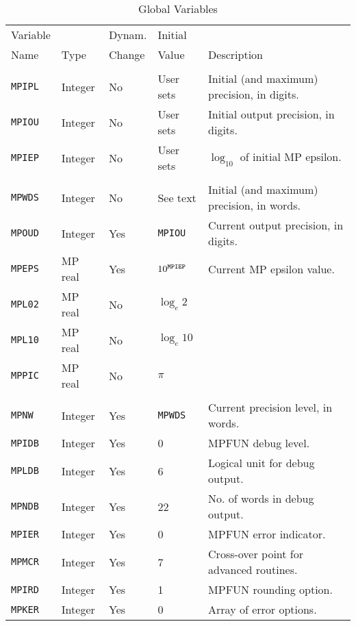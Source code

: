 \begin{table} \begin{center} 
\begin{tabular}{|l|l|l|l|l|}
\hline
Variable    &          &Dynam. &Initial &    \\
Name        & Type     &Change &Value   & Description \\
\hline
            &          &       &        & \\
{\tt MPIPL} & Integer  & No    & User sets & Initial (and maximum) precision, 
  in digits. \\
{\tt MPIOU} & Integer  & No    & User sets & Initial output precision, in
  digits. \\
{\tt MPIEP} & Integer  & No    & User sets & $\log_{10}$ of initial MP
  epsilon.\\
\hline
            &          &       &        & \\
{\tt MPWDS} & Integer  & No    & See text  & Initial (and maximum) precision,
  in words. \\ 
{\tt MPOUD} & Integer  & Yes   & {\tt MPIOU} & Current output precision, 
  in digits. \\
{\tt MPEPS} & MP real  & Yes   & $10^{\tt MPIEP}$& Current MP epsilon value. \\
{\tt MPL02} & MP real  & No    & $\log_e 2$  &  \\
{\tt MPL10} & MP real  & No    & $\log_e 10$ &  \\
{\tt MPPIC} & MP real  & No    & $\pi$     &  \\
\hline
            &          &       &        & \\
{\tt MPNW}  & Integer  & Yes   & {\tt MPWDS} & Current precision level, 
  in words.\\ 
{\tt MPIDB} & Integer  & Yes   &      0 & MPFUN debug level. \\
{\tt MPLDB} & Integer  & Yes   &      6 & Logical unit for debug output.\\
{\tt MPNDB} & Integer  & Yes   &     22 & No. of words in debug output.\\
{\tt MPIER} & Integer  & Yes   &      0 & MPFUN error indicator. \\
{\tt MPMCR} & Integer  & Yes   &      7 & Cross-over point for advanced 
  routines.\\ 
{\tt MPIRD} & Integer  & Yes   &      1 & MPFUN rounding option. \\
{\tt MPKER} & Integer  & Yes   &      0 & Array of error options. \\
\hline
\end{tabular}
\caption{Global Variables}
\end{center} \end{table}

